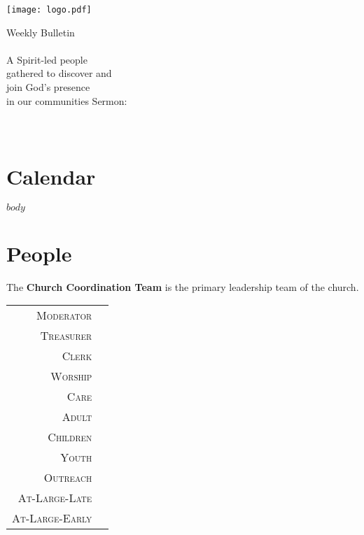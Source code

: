 \documentclass[
notumble,
nofoldmark,
letterpaper,
10pt,
]{leaflet}
\date{\formatdate{#3}{#2}{#1}}%
\newcommand{\cct}[1]{
        \textsc{#1} & \textbf{\DTLfetch{cct}{Position}{#1}{Name}} \\}
\begin{document}
\begin{titlepage}
\centering
\vfill
{\centering
\texttt{[image: logo.pdf]}\par}
\vfill
\large Weekly Bulletin\\
\LARGE\sundaydate\\
\vfill
\large A Spirit-led people \\ gathered to discover and \\ join God's presence \\ in our communities
\vfill
\vfill
\large Sermon:\\
\LARGE\sermontitle\\
\LARGE\scripture\\

\vfill
\end{titlepage}

\thispagestyle{empty}

\section{\faCalendar \hspace{.5em} Calendar}




\vfill

\pagebreak


$body$


\vfill

\pagebreak

\section{\faGroup \hspace{.5em} People}


The \textbf{Church Coordination Team} is the primary leadership team of the church.

\begin{tabular}{rl}
\cct{Moderator}
\cct{Treasurer}
\cct{Clerk}
\cct{Worship}
\cct{Care}
\cct{Adult}
\cct{Children}
\cct{Youth}
\cct{Outreach}
\cct{At-Large-Late}
\cct{At-Large-Early}
\end{tabular}
\end{document}
